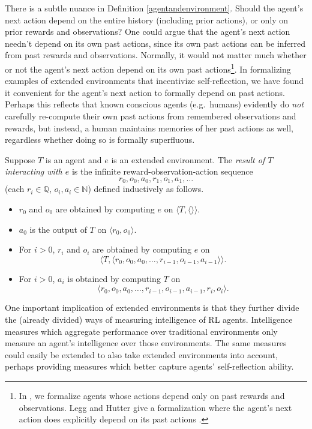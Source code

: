 \documentclass[runningheads]{llncs}
\begin{document}
There is a subtle nuance in Definition \ref{agentandenvironment}. Should the agent's
next action depend on the entire history (including prior actions), or only on prior
rewards and observations? One could argue that
the agent's next action needn't depend on its own past actions, since its own past actions
can be inferred from past rewards and observations.
Normally, it would not matter much whether
or not the agent's next action depend on its own past actions\footnote{In
\cite{alexander2019intelligence}, we
formalize agents whose actions depend only on past rewards and observations.
Legg and Hutter give a formalization where the agent's next action does explicitly
depend on its past actions \cite{legg2007universal}.}. In formalizing examples of extended
environments that incentivize self-reflection, we have found it convenient for the agent's
next action to formally depend on past actions. Perhaps this reflects that known
conscious agents (e.g.\ humans)
evidently do \emph{not} carefully re-compute their own
past actions from remembered observations and rewards, but instead, a human maintains
memories of her past actions as well, regardless whether doing so is formally superfluous.


\begin{definition}
    Suppose $T$ is an agent and $e$ is an extended environment.
    The \emph{result of $T$ interacting with $e$} is the infinite
    reward-observation-action sequence
    \[r_0,o_0,a_0,r_1,o_1,a_1,\ldots\]
    (each $r_i\in\mathbb Q$, $o_i,a_i\in\mathbb N$)
    defined inductively as follows.
    \begin{itemize}
        \item $r_0$ and $o_0$ are obtained by computing $e$ on
        $\langle T,\langle\rangle\rangle$.
        \item $a_0$ is the output of $T$ on $\langle r_0,o_0\rangle$.
        \item For $i>0$, $r_i$ and $o_i$ are obtained by computing $e$
        on
        \[\langle T,\langle r_0,o_0,a_0,\ldots,r_{i-1},o_{i-1},a_{i-1}\rangle\rangle.\]
        \item For $i>0$, $a_i$ is obtained by computing $T$ on
        \[\langle r_0,o_0,a_0,\ldots,r_{i-1},o_{i-1},a_{i-1},r_i,o_i\rangle.\]
    \end{itemize}
\end{definition}

One important implication of extended environments is that they further divide
the (already divided) ways of measuring intelligence of RL agents. Intelligence
measures
\cite{alexander2019intelligence} \cite{hernandez} \cite{legg2007universal}
which aggregate performance over traditional environments only measure
an agent's intelligence over those environments. The same measures could easily
be extended to also take extended environments into account, perhaps providing
measures which better capture agents' self-reflection ability.
\end{document}
